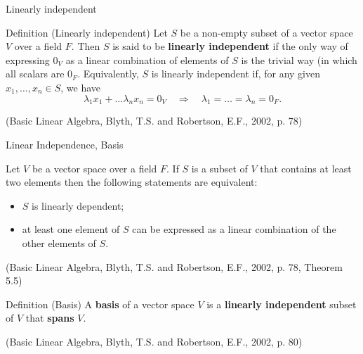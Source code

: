 \documentclass{beamer}
\begin{document}
\begin{frame}{Linearly independent}
    \begin{block}{Definition (Linearly independent)}
        Let $S$ be a non-empty subset of a vector space $V$ over a field $F$. Then $S$ is said to be \textbf{linearly independent} if the only way of expressing $0_V$ as a linear combination of elements of $S$ is the trivial way (in which all scalars are $0_F$.
        Equivalently, $S$ is linearly independent if, for any given $x_1, \dots, x_n \in S$, we have
        $$\lambda_1 x_1 + \dots \lambda_n x_n =0_V \quad \Rightarrow \quad \lambda_1 = \dots = \lambda_n = 0_F.$$
        \par \vspace{3mm} (Basic Linear Algebra, Blyth, T.S. and Robertson, E.F., 2002, p. 78)
    \end{block}
\end{frame}

\begin{frame}{Linear Independence, Basis}
    \begin{theorem}
        Let $V$ be a vector space over a field $F$. If $S$ is a subset of $V$ that contains at least two elements then the following statements are equivalent:
        \begin{itemize}
        	\item $S$ is linearly dependent;
        	\item at least one element of $S$ can be expressed as a linear combination of the other elements of $S$.
        \end{itemize}
        \par \vspace{1mm} (Basic Linear Algebra, Blyth, T.S. and Robertson, E.F., 2002, p. 78, Theorem 5.5)
    \end{theorem}
    
    \pause
    
    \begin{block}{Definition (Basis)}
        A \textbf{basis} of a vector space $V$ is a \textbf{linearly independent} subset of $V$ that \textbf{spans} $V$.
        \par \vspace{1mm} (Basic Linear Algebra, Blyth, T.S. and Robertson, E.F., 2002, p. 80)
    \end{block}
\end{frame}
\end{document}
